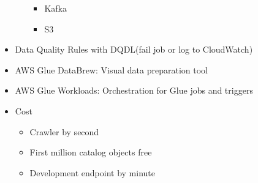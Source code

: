\documentclass[../../main.tex]{subfiles}
\begin{document}
\begin{itemize}
\begin{itemize}
\begin{itemize}
            \item Kafka
            \item S3
        \end{itemize}
    \end{itemize}
    \item Data Quality Rules with DQDL(fail job or log to CloudWatch)
    \item AWS Glue DataBrew: Visual data preparation tool
    \item AWS Glue Workloads: Orchestration for Glue jobs and triggers
    \item Cost
    \begin{itemize}
        \item Crawler by second
        \item First million catalog objects free
        \item Development endpoint by minute
    \end{itemize}
\end{itemize}
\end{document}

